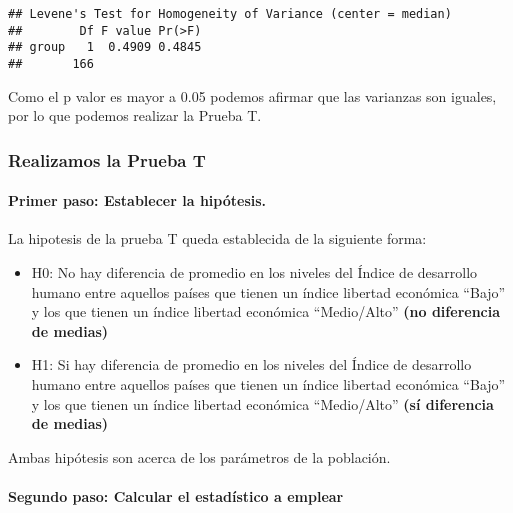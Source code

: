 \documentclass[
]{article}
\begin{document}
\begin{verbatim}
## Levene's Test for Homogeneity of Variance (center = median)
##        Df F value Pr(>F)
## group   1  0.4909 0.4845
##       166
\end{verbatim}

Como el p valor es mayor a 0.05 podemos afirmar que las varianzas son
iguales, por lo que podemos realizar la Prueba T.

\hypertarget{realizamos-la-prueba-t}{%
\subsubsection{\texorpdfstring{\textbf{Realizamos la Prueba
T}}{Realizamos la Prueba T}}\label{realizamos-la-prueba-t}}

\hypertarget{primer-paso-establecer-la-hipuxf3tesis.}{%
\paragraph{\texorpdfstring{\textbf{Primer paso: Establecer la
hipótesis.}}{Primer paso: Establecer la hipótesis.}}\label{primer-paso-establecer-la-hipuxf3tesis.}}

La hipotesis de la prueba T queda establecida de la siguiente forma:

\begin{itemize}
\item
  H0: No hay diferencia de promedio en los niveles del Índice de
  desarrollo humano entre aquellos países que tienen un índice libertad
  económica ``Bajo'' y los que tienen un índice libertad económica
  ``Medio/Alto'' \textbf{(no diferencia de medias)}
\item
  H1: Si hay diferencia de promedio en los niveles del Índice de
  desarrollo humano entre aquellos países que tienen un índice libertad
  económica ``Bajo'' y los que tienen un índice libertad económica
  ``Medio/Alto'' \textbf{(sí diferencia de medias)}
\end{itemize}

Ambas hipótesis son acerca de los parámetros de la población.

\hypertarget{segundo-paso-calcular-el-estaduxedstico-a-emplear}{%
\paragraph{\texorpdfstring{\textbf{Segundo paso: Calcular el estadístico
a
emplear}}{Segundo paso: Calcular el estadístico a emplear}}\label{segundo-paso-calcular-el-estaduxedstico-a-emplear}}
\end{document}

